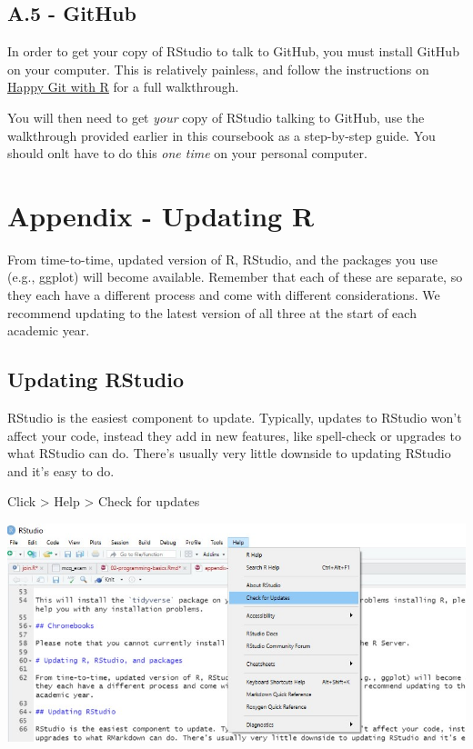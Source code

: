 \documentclass[
]{book}
\begin{document}
\hypertarget{a.5---github}{%
\section{A.5 - GitHub}\label{a.5---github}}

In order to get your copy of RStudio to talk to GitHub, you must install GitHub on your computer. This is relatively painless, and follow the instructions on \href{https://happygitwithr.com/install-git.html}{Happy Git with R} for a full walkthrough.

You will then need to get \emph{your} copy of RStudio talking to GitHub, use the walkthrough provided earlier in this coursebook as a step-by-step guide. You should onlt have to do this \emph{one time} on your personal computer.

\hypertarget{appendix---updating-r}{%
\chapter{Appendix - Updating R}\label{appendix---updating-r}}

From time-to-time, updated version of R, RStudio, and the packages you use (e.g., ggplot) will become available. Remember that each of these are separate, so they each have a different process and come with different considerations. We recommend updating to the latest version of all three at the start of each academic year.

\hypertarget{updating-rstudio}{%
\section{Updating RStudio}\label{updating-rstudio}}

RStudio is the easiest component to update. Typically, updates to RStudio won't affect your code, instead they add in new features, like spell-check or upgrades to what RStudio can do. There's usually very little downside to updating RStudio and it's easy to do.

Click \textgreater{} Help \textgreater{} Check for updates

\includegraphics[width=0.8\linewidth]{images/update_rstudio}
\end{document}

